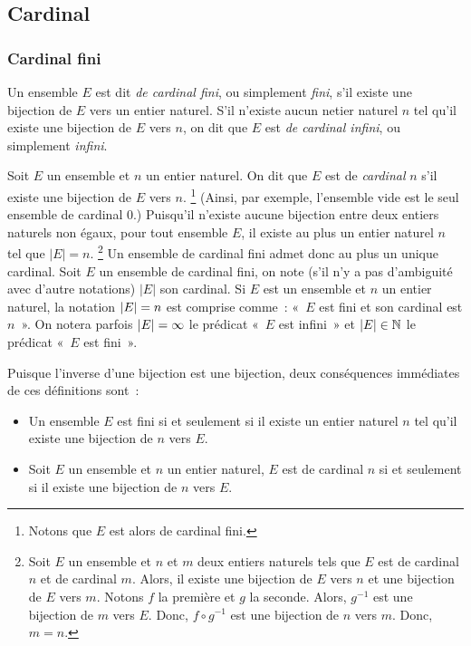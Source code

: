 \subsection{Cardinal} 

\subsubsection{Cardinal fini}

Un ensemble $E$ est dit \textit{de cardinal fini}, ou simplement \textit{fini}, s'il existe une bijection de $E$ vers un entier naturel.
S'il n'existe aucun netier naturel $n$ tel qu'il existe une bijection de $E$ vers $n$, on dit que $E$ est \textit{de cardinal infini}, ou simplement \textit{infini}. 

Soit $E$ un ensemble et $n$ un entier naturel. 
On dit que $E$ est de \textit{cardinal} $n$ s'il existe une bijection de $E$ vers $n$.%
\footnote{
    Notons que $E$ est alors de cardinal fini.
}
(Ainsi, par exemple, l'ensemble vide est le seul ensemble de cardinal $0$.)
Puisqu'il n'existe aucune bijection entre deux entiers naturels non égaux, pour tout ensemble $E$, il existe au plus un entier naturel $n$ tel que $\lvert E \rvert = n$.%
\footnote{
    Soit $E$ un ensemble et $n$ et $m$ deux entiers naturels tels que $E$ est de cardinal $n$ et de cardinal $m$. 
    Alors, il existe une bijection de $E$ vers $n$ et une bijection de $E$ vers $m$.
    Notons $f$ la première et $g$ la seconde. 
    Alors, $g^{-1}$ est une bijection de $m$ vers $E$. 
    Donc, $f \circ g^{-1}$ est une bijection de $n$ vers $m$.
    Donc, $m = n$.
}
Un ensemble de cardinal fini admet donc au plus un unique cardinal.
Soit $E$ un ensemble de cardinal fini, on note (s'il n'y a pas d'ambiguité avec d'autre notations) $\lvert E \rvert$ son cardinal. 
Si $E$ est un ensemble et $n$ un entier naturel, la notation $\left\lvert E \right\rvert = n$ est comprise comme : « $E$ est fini et son cardinal est $n$ ». 
On notera parfois $\left\lvert E \right\rvert = \infty$ le prédicat « $E$ est infini » et $\left\lvert E \right\rvert \in \mathbb{N}$ le prédicat « $E$ est fini ».

Puisque l'inverse d'une bijection est une bijection, deux conséquences immédiates de ces définitions sont : 
\begin{itemize}[nosep]
    \item Un ensemble $E$ est fini si et seulement si il existe un entier naturel $n$ tel qu'il existe une bijection de $n$ vers $E$. 
    \item Soit $E$ un ensemble et $n$ un entier naturel, $E$ est de cardinal $n$ si et seulement si il existe une bijection de $n$ vers $E$. 
\end{itemize}

